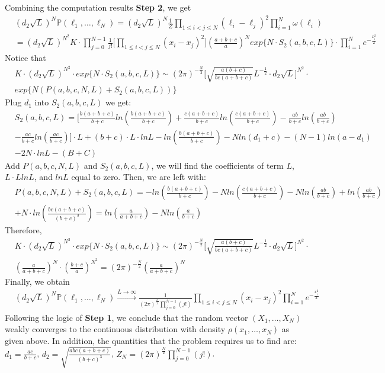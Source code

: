 \documentclass[12pt]{article}
\begin{document}
Combining the computation results \textbf{Step 2}, we get
\begin{align*}
	&(d_{2}\sqrt{L})^{N}\mathbb{P}(\ell_{1},\dots,\ell_{N})=(d_{2}\sqrt{L})^{N}\frac{1}{Z}\prod_{1\leqslant i <j\leqslant N}(\ell_{i}-\ell_{j})^{2}\prod_{i=1}^{N}\omega(\ell_{i})\\
	&=(d_{2}\sqrt{L})^{N^2}K\cdot\prod_{j=0}^{N-1}\frac{1}{j!}\Big[\prod_{1\leqslant i <j\leqslant N}(x_{i}-x_{j})^{2}\Big](\frac{a+b+c}{a})^{N}exp\{N\cdot S_{2}(a,b,c,L)\}\cdot\prod_{i=1}^{N}e^{-\frac{x_{i}^{2}}{2}}
\end{align*}
Notice that
\begin{align*}
	&K\cdot(d_{2}\sqrt{L})^{N^2}\cdot exp\{N\cdot S_{2}(a,b,c,L)\} \sim (2\pi)^{-\frac{N}{2}}\Big[\sqrt{\frac{a(b+c)}{bc(a+b+c)}}L^{-\frac{1}{2}}\cdot d_{2}\sqrt{L} \Big]^{N^2}\cdot\\
	& exp\{N(P(a,b,c,N,L)+S_{2}(a,b,c,L))\}
\end{align*}
Plug $d_{1}$ into $S_{2}(a,b,c,L)$ we get:
\begin{align*}
	& S_{2}(a,b,c,L)=\Big[\frac{b(a+b+c)}{b+c}ln(\frac{b(a+b+c)}{b+c})+\frac{c(a+b+c)}{b+c}ln(\frac{c(a+b+c)}{b+c})-\frac{ab}{b+c}ln(\frac{ab}{b+c})\\
	& -\frac{ac}{b+c}ln(\frac{ac}{b+c})\Big]\cdot L+(b+c)\cdot L\cdot lnL -ln(\frac{b(a+b+c)}{b+c})-Nln(d_{1}+c) -(N-1)ln(a-d_{1})\\
	&-2N\cdot lnL-(B+C)
\end{align*}
Add $P(a,b,c,N,L)$ and $S_{2}(a,b,c,L)$, we will find the coefficients of term $L$, $L\cdot LlnL$, and $lnL$ equal to zero. Then, we are left with: 
\begin{align*}
	&P(a,b,c,N,L)+S_{2}(a,b,c,L)= -ln(\frac{b(a+b+c)}{b+c})-Nln(\frac{c(a+b+c)}{b+c})-Nln(\frac{ab}{b+c})+ln(\frac{ab}{b+c})\\
	& +N\cdot ln(\frac{bc(a+b+c)}{(b+c)^3}) = ln(\frac{a}{a+b+c})-Nln(\frac{a}{b+c})
\end{align*}
Therefore, 
\begin{align*}
	&K\cdot(d_{2}\sqrt{L})^{N^2}\cdot exp\{N\cdot S_{2}(a,b,c,L)\} \sim (2\pi)^{-\frac{N}{2}}\Big[\sqrt{\frac{a(b+c)}{bc(a+b+c)}}L^{-\frac{1}{2}}\cdot d_{2}\sqrt{L} \Big]^{N^2}\cdot\\
	& (\frac{a}{a+b+c})^{N}\cdot (\frac{b+c}{a})^{N^2}=(2\pi)^{-\frac{N}{2}}(\frac{a}{a+b+c})^{N}
\end{align*}
Finally, we obtain
\begin{align*}
	&(d_{2}\sqrt{L})^{N}\mathbb{P}(\ell_{1},\dots,\ell_{N})\xrightarrow{L\rightarrow\infty}\frac{1}{(2\pi)^{\frac{N}{2}}\prod_{j=0}^{N-1}(j!)}\prod_{1\leqslant i<j\leqslant N}(x_{i}-x_{j})^2\prod_{i=1}^{N}e^{-\frac{x_{i}^2}{2}}
\end{align*}
Following the logic of \textbf{Step 1}, we conclude that the random vector $(X_{1},\dots,X_{N})$ weakly converges to the continuous distribution with density $\rho(x_{1},\dots,x_{N})$ as given above. In addition, the quantities that the problem requires us to find are: $d_{1}=\frac{ac}{b+c}$, $d_{2}=\sqrt{\frac{abc(a+b+c)}{(b+c)^3}}$, $Z_{N}=(2\pi)^{\frac{N}{2}}\prod_{j=0}^{N-1}(j!)$.
\end{document}
